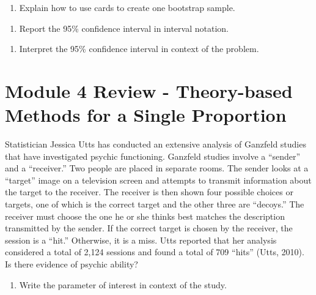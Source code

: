 \documentclass[
]{report}
\providecommand{\tightlist}{%
  \setlength{\itemsep}{0pt}\setlength{\parskip}{0pt}}
\begin{document}
\begin{enumerate}
\def\labelenumi{\arabic{enumi}.}
\setcounter{enumi}{11}
\tightlist
\item
  Explain how to use cards to create one bootstrap sample.
\end{enumerate}

\vspace{1in}

\begin{enumerate}
\def\labelenumi{\arabic{enumi}.}
\setcounter{enumi}{12}
\tightlist
\item
  Report the 95\% confidence interval in interval notation.
\end{enumerate}

\vspace{0.2in}

\begin{enumerate}
\def\labelenumi{\arabic{enumi}.}
\setcounter{enumi}{13}
\tightlist
\item
  Interpret the 95\% confidence interval in context of the problem.
\end{enumerate}

\vspace{0.8in}

\newpage

\section{Module 4 Review - Theory-based Methods for a Single Proportion}\label{module-4-review---theory-based-methods-for-a-single-proportion}

Statistician Jessica Utts has conducted an extensive analysis of Ganzfeld studies that have investigated psychic functioning. Ganzfeld studies involve a ``sender'' and a ``receiver.'' Two people are placed in separate rooms. The sender looks at a ``target'' image on a television screen and attempts to transmit information about the target to the receiver. The receiver is then shown four possible choices or targets, one of which is the correct target and the other three are ``decoys.'' The receiver must choose the one he or she thinks best matches the description transmitted by the sender. If the correct target is chosen by the receiver, the session is a ``hit.'' Otherwise, it is a miss. Utts reported that her analysis considered a total of 2,124 sessions and found a total of 709 ``hits'' (Utts, 2010). Is there evidence of psychic ability?

\begin{enumerate}
\def\labelenumi{\arabic{enumi}.}
\tightlist
\item
  Write the parameter of interest in context of the study.
\end{enumerate}
\end{document}
